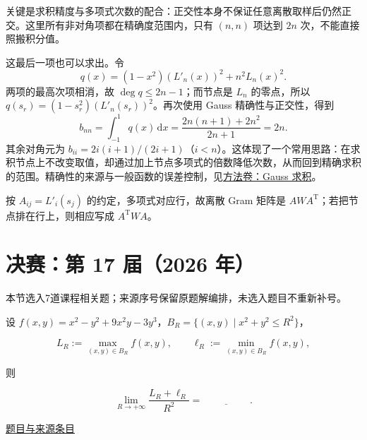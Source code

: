 \documentclass[UTF8,12pt,a4paper,fontset=fandol]{ctexart}
\begin{document}
\begin{remark}[方法与条件]关键是求积精度与多项式次数的配合：正交性本身不保证任意离散取样后仍然正交。这里所有非对角项都在精确度范围内，只有 $(n,n)$ 项达到 $2n$ 次，不能直接照搬积分值。

这最后一项也可以求出。令
\[
q(x)=(1-x^2)(L'_n(x))^2+n^2L_n(x)^2.
\]
两项的最高次项相消，故 $\deg q\le2n-1$；而节点是 $L_n$ 的零点，所以 $q(s_r)=(1-s_r^2)(L'_n(s_r))^2$。再次使用 Gauss 精确性与正交性，得到
\[
b_{nn}=\int_{-1}^1q(x)\,\mathrm dx
=\frac{2n(n+1)+2n^2}{2n+1}=2n.
\]
其余对角元为 $b_{ii}=2i(i+1)/(2i+1)$（$i<n$）。这体现了一个常用思路：在求积节点上不改变取值，却通过加上节点多项式的倍数降低次数，从而回到精确求积的范围。精确性的来源与一般函数的误差控制，见\hyperref[app:estimate-gauss]{方法卷：Gauss 求积}。

按 $A_{ij}=L'_i(s_j)$ 的约定，多项式对应行，故离散 Gram 矩阵是 $AWA^{\mathrm T}$；若把节点排在行上，则相应写成 $A^{\mathrm T}WA$。\end{remark}

\section{决赛：第 17 届（2026 年）}

本节选入7道课程相关题；来源序号保留原题解编排，未选入题目不重新补号。

\begin{example}[来源序号2]\label{ex:fin17-high:2}\label{pr:fin17-high:2}

设 $f(x,y)=x^2-y^2+9x^2y-3y^3$，$B_R=\{(x,y)\mid x^2+y^2\le R^2\}$，

\[
L_R:=\max_{(x,y)\in B_R}f(x,y),\qquad \ell_R:=\min_{(x,y)\in B_R}f(x,y),
\]

则

\[
\lim_{R\to+\infty}\frac{L_R+\ell_R}{R^2}=\underline{\hspace{2cm}}.
\]

\par\href{https://github.com/lzxcr/cmc-mathematics/blob/64916fa1fdbc3e444a652eca204d5669058ee321/src/problems/finals/17/02.md}{题目与来源条目}

\end{example}
\end{document}
